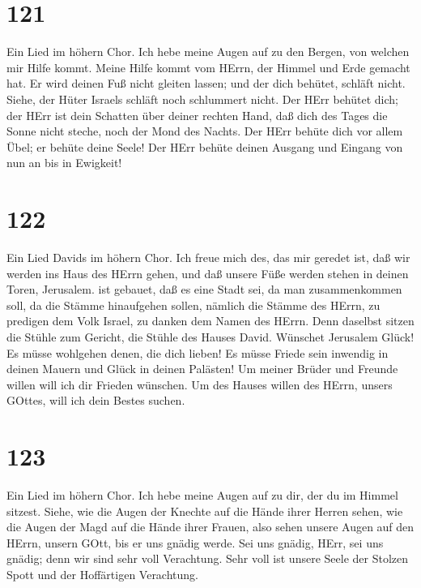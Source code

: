 \hypertarget{section-120}{%
\section{121}\label{section-120}}

 Ein Lied im höhern Chor. Ich hebe meine Augen auf zu den
Bergen, von welchen mir Hilfe kommt.  Meine Hilfe kommt vom
HErrn, der Himmel und Erde gemacht hat.  Er wird deinen Fuß
nicht gleiten lassen; und der dich behütet, schläft nicht. 
Siehe, der Hüter Israels schläft noch schlummert nicht.  Der
HErr behütet dich; der HErr ist dein Schatten über deiner rechten Hand,
 daß dich des Tages die Sonne nicht steche, noch der Mond
des Nachts.  Der HErr behüte dich vor allem Übel; er behüte
deine Seele!  Der HErr behüte deinen Ausgang und Eingang von
nun an bis in Ewigkeit!

\hypertarget{section-121}{%
\section{122}\label{section-121}}

 Ein Lied Davids im höhern Chor. Ich freue mich des, das mir
geredet ist, daß wir werden ins Haus des HErrn gehen,  und
daß unsere Füße werden stehen in deinen Toren, Jerusalem. 
ist gebauet, daß es eine Stadt sei, da man zusammenkommen soll,
 da die Stämme hinaufgehen sollen, nämlich die Stämme des
HErrn, zu predigen dem Volk Israel, zu danken dem Namen des HErrn.
 Denn daselbst sitzen die Stühle zum Gericht, die Stühle des
Hauses David.  Wünschet Jerusalem Glück! Es müsse wohlgehen
denen, die dich lieben!  Es müsse Friede sein inwendig in
deinen Mauern und Glück in deinen Palästen!  Um meiner
Brüder und Freunde willen will ich dir Frieden wünschen.  Um
des Hauses willen des HErrn, unsers GOttes, will ich dein Bestes suchen.

\hypertarget{section-122}{%
\section{123}\label{section-122}}

 Ein Lied im höhern Chor. Ich hebe meine Augen auf zu dir,
der du im Himmel sitzest.  Siehe, wie die Augen der Knechte
auf die Hände ihrer Herren sehen, wie die Augen der Magd auf die Hände
ihrer Frauen, also sehen unsere Augen auf den HErrn, unsern GOtt, bis er
uns gnädig werde.  Sei uns gnädig, HErr, sei uns gnädig;
denn wir sind sehr voll Verachtung.  Sehr voll ist unsere
Seele der Stolzen Spott und der Hoffärtigen Verachtung.

